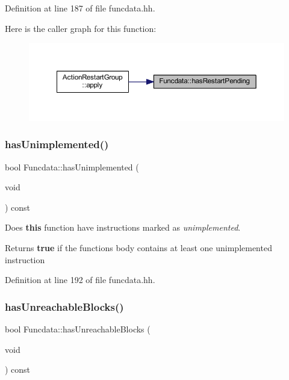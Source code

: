 Definition at line 187 of file funcdata.\+hh.

Here is the caller graph for this function\+:
\nopagebreak
\begin{figure}[H]
\begin{center}
\leavevmode
\includegraphics[width=350pt]{class_funcdata_ae349f4a44febd9dd27ca63f7f8840103_icgraph}
\end{center}
\end{figure}
\mbox{\label{class_funcdata_afef27da9040d28296accaaa1c1982401}} 
\subsubsection{\texorpdfstring{hasUnimplemented()}{hasUnimplemented()}}
{\footnotesize\ttfamily bool Funcdata\+::has\+Unimplemented (\begin{DoxyParamCaption}\item[{void}]{ }\end{DoxyParamCaption}) const\hspace{0.3cm}{\ttfamily [inline]}}



Does {\bfseries{this}} function have instructions marked as {\itshape unimplemented}. 

\begin{DoxyReturn}{Returns}
{\bfseries{true}} if the function\textquotesingle{}s body contains at least one unimplemented instruction 
\end{DoxyReturn}


Definition at line 192 of file funcdata.\+hh.

\mbox{\label{class_funcdata_ae7daf83122a6a2ffff93774466baab26}} 
\subsubsection{\texorpdfstring{hasUnreachableBlocks()}{hasUnreachableBlocks()}}
{\footnotesize\ttfamily bool Funcdata\+::has\+Unreachable\+Blocks (\begin{DoxyParamCaption}\item[{void}]{ }\end{DoxyParamCaption}) const\hspace{0.3cm}{\ttfamily [inline]}}



